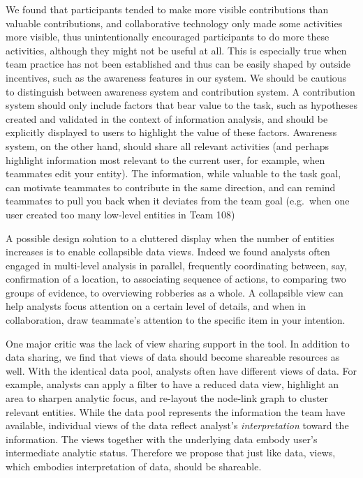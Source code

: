 We found that participants tended to make more visible contributions
than valuable contributions, and collaborative technology only made some
activities more visible, thus unintentionally encouraged participants to
do more these activities, although they might not be useful at all. This
is especially true when team practice has not been established and thus
can be easily shaped by outside incentives, such as the awareness
features in our system. We should be cautious to distinguish between
awareness system and contribution system. A contribution system should
only include factors that bear value to the task, such as hypotheses
created and validated in the context of information analysis, and should
be explicitly displayed to users to highlight the value of these
factors. Awareness system, on the other hand, should share all relevant
activities (and perhaps highlight information most relevant to the
current user, for example, when teammates edit your entity). The
information, while valuable to the task goal, can motivate teammates to
contribute in the same direction, and can remind teammates to pull you
back when it deviates from the team goal (e.g.~when one user created too
many low-level entities in Team 108)

A possible design solution to a cluttered display when the number of
entities increases is to enable collapsible data views. Indeed we found
analysts often engaged in multi-level analysis in parallel, frequently
coordinating between, say, confirmation of a location, to associating
sequence of actions, to comparing two groups of evidence, to overviewing
robberies as a whole. A collapsible view can help analysts focus
attention on a certain level of details, and when in collaboration, draw
teammate's attention to the specific item in your intention.

One major critic was the lack of view sharing support in the tool. In
addition to data sharing, we find that views of data should become
shareable resources as well. With the identical data pool, analysts
often have different views of data. For example, analysts can apply a
filter to have a reduced data view, highlight an area to sharpen
analytic focus, and re-layout the node-link graph to cluster relevant
entities. While the data pool represents the information the team have
available, individual views of the data reflect analyst's
\emph{interpretation} toward the information. The views together with
the underlying data embody user's intermediate analytic status.
Therefore we propose that just like data, views, which embodies
interpretation of data, should be shareable.

